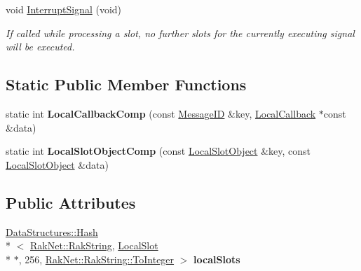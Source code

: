 \begin{DoxyCompactItemize}
\item 
\hypertarget{class_rak_net_1_1_r_p_c4_af0e31a1377408727bfa0afe19dda4261}{void \hyperlink{class_rak_net_1_1_r_p_c4_af0e31a1377408727bfa0afe19dda4261}{Interrupt\-Signal} (void)}\label{class_rak_net_1_1_r_p_c4_af0e31a1377408727bfa0afe19dda4261}

\begin{DoxyCompactList}\small\item\em If called while processing a slot, no further slots for the currently executing signal will be executed. \end{DoxyCompactList}\end{DoxyCompactItemize}
\subsection*{Static Public Member Functions}
\begin{DoxyCompactItemize}
\item 
\hypertarget{class_rak_net_1_1_r_p_c4_a6f1fefe4520d5c8219e61c1a7c58f5ad}{static int {\bfseries Local\-Callback\-Comp} (const \hyperlink{namespace_rak_net_a1b2f3bf4bad2bb6a8360a12295fbed0c}{Message\-I\-D} \&key, \hyperlink{struct_rak_net_1_1_r_p_c4_1_1_local_callback}{Local\-Callback} $\ast$const \&data)}\label{class_rak_net_1_1_r_p_c4_a6f1fefe4520d5c8219e61c1a7c58f5ad}

\item 
\hypertarget{class_rak_net_1_1_r_p_c4_a5c793a3b6cc1cf7515abd4674c9e3d12}{static int {\bfseries Local\-Slot\-Object\-Comp} (const \hyperlink{struct_rak_net_1_1_r_p_c4_1_1_local_slot_object}{Local\-Slot\-Object} \&key, const \hyperlink{struct_rak_net_1_1_r_p_c4_1_1_local_slot_object}{Local\-Slot\-Object} \&data)}\label{class_rak_net_1_1_r_p_c4_a5c793a3b6cc1cf7515abd4674c9e3d12}

\end{DoxyCompactItemize}
\subsection*{Public Attributes}
\begin{DoxyCompactItemize}
\item 
\hypertarget{class_rak_net_1_1_r_p_c4_aa070ff3a35855580b202237a1e45ad6f}{\hyperlink{class_data_structures_1_1_hash}{Data\-Structures\-::\-Hash}\\*
$<$ \hyperlink{class_rak_net_1_1_rak_string}{Rak\-Net\-::\-Rak\-String}, \hyperlink{struct_rak_net_1_1_r_p_c4_1_1_local_slot}{Local\-Slot} \\*
$\ast$, 256, \hyperlink{class_rak_net_1_1_rak_string_a79f546baedf74c64a820297b40590250}{Rak\-Net\-::\-Rak\-String\-::\-To\-Integer} $>$ {\bfseries local\-Slots}}\label{class_rak_net_1_1_r_p_c4_aa070ff3a35855580b202237a1e45ad6f}

\end{DoxyCompactItemize}
